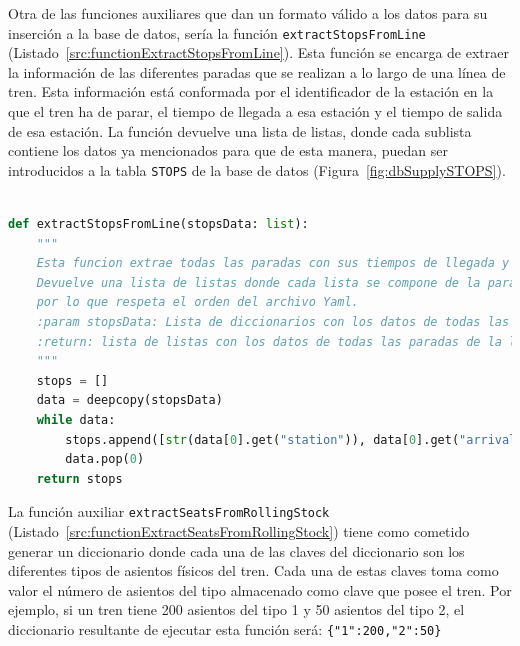 Otra de las funciones auxiliares que dan un formato válido a los datos para su inserción a la base de datos, sería la función \texttt{extractStopsFromLine} (Listado~\ref{src:functionExtractStopsFromLine}). Esta función se encarga de extraer la información de las diferentes paradas que se realizan a lo largo de una línea de tren. Esta información está conformada por el identificador de la estación en la que el tren ha de parar, el tiempo de llegada a esa estación y el tiempo de salida de esa estación. La función devuelve una lista de listas, donde cada sublista contiene los datos ya mencionados para que de esta manera, puedan ser introducidos a la tabla \texttt{STOPS} de la base de datos (Figura~\ref{fig:dbSupplySTOPS}).

\begin{lstlisting}[language=Python,
                   style=python,
                   frame=none,
                   numbers=none,
                   basicstyle=\ttfamily\normalsize,
                   caption={Función \texttt{extractStopsFromLine}},
                   label=src:functionExtractStopsFromLine,
                   inputencoding=utf8]                   

def extractStopsFromLine(stopsData: list):
    """
    Esta funcion extrae todas las paradas con sus tiempos de llegada y salida de una linea.
    Devuelve una lista de listas donde cada lista se compone de la parada, tiempo de llegada y tiepo de salida,
    por lo que respeta el orden del archivo Yaml.
    :param stopsData: Lista de diccionarios con los datos de todas las paradas en la linea.
    :return: lista de listas con los datos de todas las paradas de la linea.
    """
    stops = []
    data = deepcopy(stopsData)
    while data:
        stops.append([str(data[0].get("station")), data[0].get("arrival_time"), data[0].get("departure_time")])
        data.pop(0)
    return stops
\end{lstlisting}

La función auxiliar \texttt{extractSeatsFromRollingStock} (Listado~\ref{src:functionExtractSeatsFromRollingStock}) tiene como cometido generar un diccionario donde cada una de las claves del diccionario son los diferentes tipos de asientos físicos del tren. Cada una de estas claves toma como valor el número de asientos del tipo almacenado como clave que posee el tren. Por ejemplo, si un tren tiene 200 asientos del tipo 1 y 50 asientos del tipo 2, el diccionario resultante de ejecutar esta función será: \texttt{\{"1":200,"2":50\}} 

